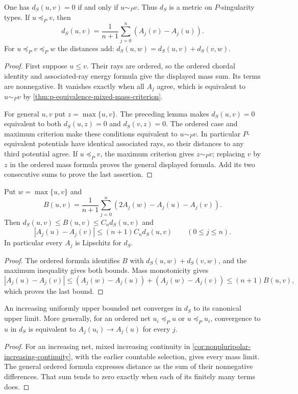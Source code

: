 \begin{theorem}\label{thm:singularity-zero-distance-and-order}
One has $d_S(u,v)=0$ if and only if $u\sim_P v$. Thus $d_S$ is a metric on $P$-singularity types. If $u\preceq_P v$, then
\[
 d_S(u,v)=\frac1{n+1}\sum_{j=0}^n(A_j(v)-A_j(u)).
\]
For $u\preceq_P v\preceq_P w$ the distances add:
$d_S(u,w)=d_S(u,v)+d_S(v,w)$.
\end{theorem}
\begin{proof}
First suppose $u\leq v$. Their rays are ordered, so the ordered chordal identity and associated-ray energy formula give the displayed mass sum. Its terms are nonnegative. It vanishes exactly when all $A_j$ agree, which is equivalent to $u\sim_P v$ by \cref{thm:p-equivalence-mixed-mass-criterion}.

For general $u,v$ put $z=\max\{u,v\}$. The preceding lemma makes $d_S(u,v)=0$ equivalent to both $d_S(u,z)=0$ and $d_S(v,z)=0$. The ordered case and maximum criterion make these conditions equivalent to $u\sim_P v$. In particular $P$-equivalent potentials have identical associated rays, so their distances to any third potential agree. If $u\preceq_P v$, the maximum criterion gives $z\sim_P v$; replacing $v$ by $z$ in the ordered mass formula proves the general displayed formula. Add its two consecutive sums to prove the last assertion.
\end{proof}

\begin{corollary}\label{cor:singularity-distance-mass-comparison}
Put $w=\max\{u,v\}$ and
\[
 B(u,v)=\frac1{n+1}\sum_{j=0}^n(2A_j(w)-A_j(u)-A_j(v)).
\]
Then $d_S(u,v)\leq B(u,v)\leq C_n d_S(u,v)$ and
\[
 |A_j(u)-A_j(v)|\leq(n+1)C_n d_S(u,v)\qquad(0\leq j\leq n).
\]
In particular every $A_j$ is Lipschitz for $d_S$.
\end{corollary}
\begin{proof}
The ordered formula identifies $B$ with $d_S(u,w)+d_S(v,w)$, and the maximum inequality gives both bounds. Mass monotonicity gives
\[
 |A_j(u)-A_j(v)|\leq(A_j(w)-A_j(u))+(A_j(w)-A_j(v))
                                      \leq(n+1)B(u,v),
\]
which proves the last bound.
\end{proof}

\begin{corollary}\label{cor:singularity-distance-increasing-and-ordered-limits}
An increasing uniformly upper bounded net converges in $d_S$ to its canonical upper limit. More generally, for an ordered net $u_i\preceq_P u$ or $u\preceq_P u_i$, convergence to $u$ in $d_S$ is equivalent to $A_j(u_i)\to A_j(u)$ for every $j$.
\end{corollary}
\begin{proof}
For an increasing net, mixed increasing continuity in \cref{cor:nonpluripolar-increasing-continuity}, with the earlier countable selection, gives every mass limit. The general ordered formula expresses distance as the sum of their nonnegative differences. That sum tends to zero exactly when each of its finitely many terms does.
\end{proof}

